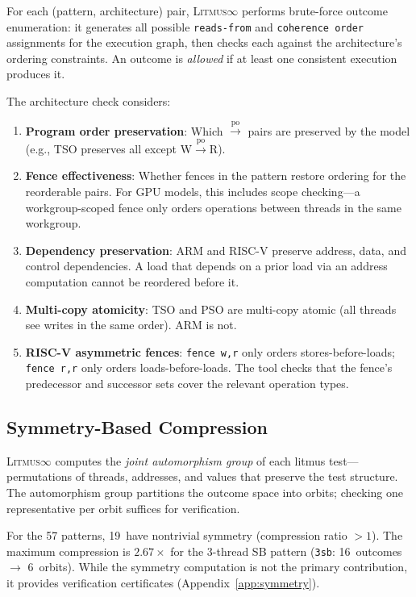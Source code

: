 \documentclass[10pt]{article}
\newcommand{\litmus}{\textsc{Litmus$\infty$}}
\newcommand{\po}{\ensuremath{\xrightarrow{\text{po}}}}
\begin{document}
For each (pattern, architecture) pair, \litmus{} performs brute-force
outcome enumeration: it generates all possible \texttt{reads-from} and
\texttt{coherence order} assignments for the execution graph, then
checks each against the architecture's ordering constraints. An outcome
is \emph{allowed} if at least one consistent execution produces it.

The architecture check considers:
\begin{enumerate}[nosep]
\item \textbf{Program order preservation}: Which $\po$ pairs are
      preserved by the model (e.g., TSO preserves all except W$\po$R).
\item \textbf{Fence effectiveness}: Whether fences in the pattern
      restore ordering for the reorderable pairs. For GPU models,
      this includes scope checking---a workgroup-scoped fence only
      orders operations between threads in the same workgroup.
\item \textbf{Dependency preservation}: ARM and RISC-V preserve
      address, data, and control dependencies. A load that depends
      on a prior load via an address computation cannot be reordered
      before it.
\item \textbf{Multi-copy atomicity}: TSO and PSO are multi-copy
      atomic (all threads see writes in the same order). ARM is not.
\item \textbf{RISC-V asymmetric fences}: \texttt{fence~w,r} only
      orders stores-before-loads; \texttt{fence~r,r} only orders
      loads-before-loads. The tool checks that the fence's
      predecessor and successor sets cover the relevant operation
      types.
\end{enumerate}

\subsection{Symmetry-Based Compression}

\litmus{} computes the \emph{joint automorphism group} of each
litmus test---permutations of threads, addresses, and values that
preserve the test structure. The automorphism group partitions
the outcome space into orbits; checking one representative per
orbit suffices for verification.

For the 57 patterns, 19~have nontrivial symmetry (compression
ratio $> 1$). The maximum compression is $2.67\times$ for the
3-thread SB pattern (\texttt{3sb}: 16~outcomes $\to$ 6~orbits).
While the symmetry computation is not the primary contribution,
it provides verification certificates (Appendix~\ref{app:symmetry}).
\end{document}
